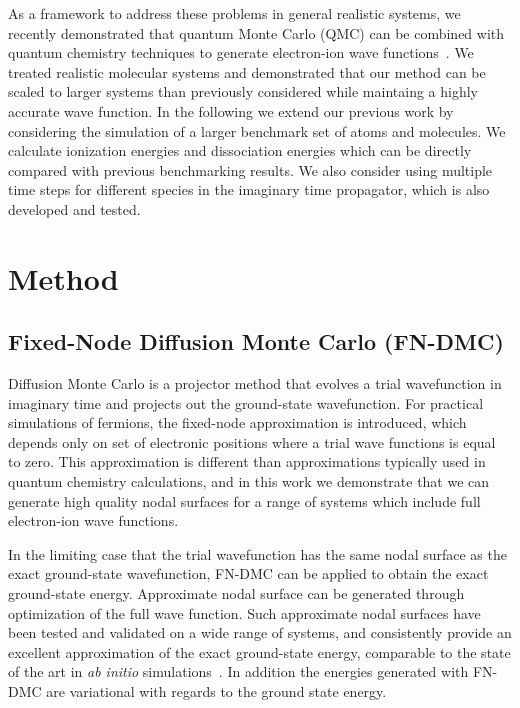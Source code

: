 \documentclass[pra,superscriptaddress,groupedaddress,twocolumn]{revtex4}
\begin{document}
As a framework to address these problems in general realistic systems, we recently demonstrated that quantum Monte Carlo (QMC) can be combined with quantum chemistry techniques to generate electron-ion wave functions~\cite{Tubman_ECG}.  We treated realistic molecular systems and demonstrated that our method can be scaled to larger systems than previously considered while maintaing a highly accurate wave function.  In the following we extend our previous work by considering the simulation of a larger benchmark set of atoms and molecules.  We calculate ionization energies and dissociation energies which can be directly compared with previous benchmarking results.  We also consider using multiple time steps for different species in the imaginary time propagator, which is also developed and tested.  %

\section{Method}
\subsection{Fixed-Node Diffusion Monte Carlo (FN-DMC)}
Diffusion Monte Carlo is a projector method that evolves a trial wavefunction in imaginary time and projects out the ground-state wavefunction.  For practical simulations of fermions, the fixed-node approximation is introduced, which depends only on set of electronic positions where a trial wave functions is equal to zero.  This approximation is different than approximations typically used in quantum chemistry calculations, and in this work we demonstrate that we can generate high quality nodal surfaces for a range of systems which include full electron-ion wave functions. 

In the limiting case that  the trial wavefunction has the same nodal surface as the exact ground-state wavefunction, FN-DMC can be applied to obtain the exact ground-state energy.  Approximate nodal surface can be generated through optimization of the full wave function. Such approximate nodal surfaces have been tested and validated on a wide range of systems, and consistently provide an excellent approximation of the exact ground-state energy,  comparable to the state of the art in \textit{ab initio} simulations~\cite{grossman1}. In addition the energies generated with FN-DMC are variational with regards to the ground state energy.
\end{document}
